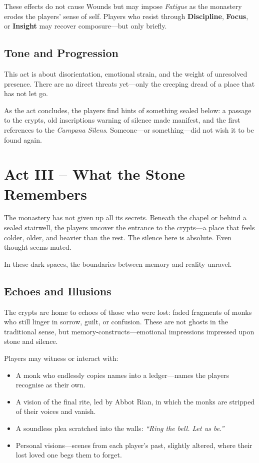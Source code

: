 \documentclass[nodeprecatedcode,bg=print]{dndbook/dndbook}
\begin{document}
These effects do not cause Wounds but may impose \emph{Fatigue} as the monastery erodes the players' sense of self. Players who resist through \textbf{Discipline}, \textbf{Focus}, or \textbf{Insight} may recover composure—but only briefly.

\subsection{Tone and Progression}

This act is about disorientation, emotional strain, and the weight of unresolved presence. There are no direct threats yet—only the creeping dread of a place that has not let go.

As the act concludes, the players find hints of something sealed below: a passage to the crypts, old inscriptions warning of silence made manifest, and the first references to the \emph{Campana Silens}. Someone—or something—did not wish it to be found again.

\section*{Act III – What the Stone Remembers}

The monastery has not given up all its secrets. Beneath the chapel or behind a sealed stairwell, the players uncover the entrance to the crypts—a place that feels colder, older, and heavier than the rest. The silence here is absolute. Even thought seems muted.

In these dark spaces, the boundaries between memory and reality unravel.

\subsection{Echoes and Illusions}

The crypts are home to echoes of those who were lost: faded fragments of monks who still linger in sorrow, guilt, or confusion. These are not ghosts in the traditional sense, but memory-constructs—emotional impressions impressed upon stone and silence.

Players may witness or interact with:
\begin{itemize}
    \item A monk who endlessly copies names into a ledger—names the players recognise as their own.
    \item A vision of the final rite, led by Abbot Rian, in which the monks are stripped of their voices and vanish.
    \item A soundless plea scratched into the walls: \emph{“Ring the bell. Let us be.”}
    \item Personal visions—scenes from each player’s past, slightly altered, where their lost loved one begs them to forget.
\end{itemize}
\end{document}
